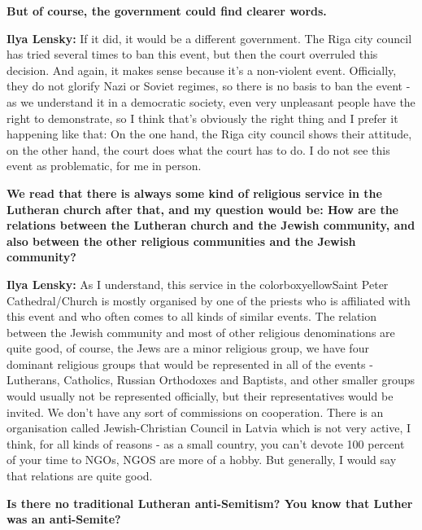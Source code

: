 \textbf{But of course, the government could find clearer words.} 

\textbf{Ilya Lensky:} If it did, it would be a different government. The Riga city council  has tried several times to ban this event, but then the court overruled this decision. And again, it makes sense because it’s a non-violent event. Officially, they do not glorify Nazi or Soviet regimes, so there is no basis to ban the event - as we understand it in a democratic society, even very unpleasant people have the right to demonstrate, so I think that’s obviously the right thing and I prefer it happening like that: On the one hand, the Riga city council shows their attitude, on the other hand, the court does what the court has to do. I do not see this event as problematic, for me in person.

\textbf{We read that there is always some kind of religious service in the Lutheran church after that, and my question would be: How are the relations between the Lutheran church and the Jewish community, and also between the other religious communities and the Jewish community?}

\textbf{Ilya Lensky:} As I understand, this service in the colorbox{yellow}{Saint Peter Cathedral/Church} is mostly organised by one of the priests who is affiliated with this event and who often comes to all kinds of similar events. The relation between the Jewish community and most of other religious denominations are quite good, of course, the Jews are a minor religious group, we have four dominant religious groups that would be represented in all of the events - Lutherans, Catholics, Russian Orthodoxes and Baptists, and other smaller groups would usually not be represented officially, but their representatives would be invited. We don’t have any sort of commissions on cooperation. There is an organisation called Jewish-Christian Council in Latvia which is not very active, I think, for all kinds of reasons - as a small country, you can’t devote 100 percent of your time to NGOs, NGOS are more of a hobby. But generally, I would say that relations are quite good. 

\textbf{Is there no traditional Lutheran anti-Semitism? You know that Luther was an anti-Semite?} 

